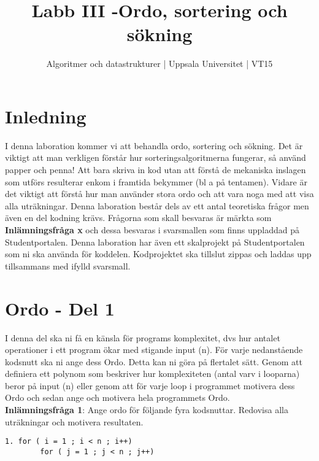 \documentclass{article}
\begin{document}
  \title{Labb III -Ordo, sortering och sökning }
  \author{ Algoritmer och datastrukturer | Uppsala Universitet | VT15 }
  \date{}
  \maketitle


  \section*{Inledning}
   I denna laboration kommer vi att behandla ordo, sortering och sökning. Det är viktigt att man verkligen förstår hur sorteringsalgoritmerna fungerar, så använd papper och penna! Att bara skriva in kod utan att förstå de mekaniska inslagen som utförs resulterar enkom i framtida bekymmer (bl a på tentamen). Vidare är det viktigt att förstå hur man använder stora ordo och att vara noga med att visa alla uträkningar. Denna laboration består dels av ett antal teoretiska frågor men även en del kodning krävs. Frågorna som skall besvaras är märkta som \textbf{Inlämningsfråga x} och dessa besvaras i svarsmallen som finns uppladdad på Studentportalen. Denna laboration har även ett skalprojekt på Studentportalen som ni ska använda för koddelen. Kodprojektet ska tillslut zippas och laddas upp tillsammans med ifylld svarsmall.
   



  \section*{Ordo - Del 1
  }

  I denna del ska ni få en känsla för programs komplexitet, dvs hur antalet operationer i ett
  program ökar med stigande input (n). För varje nedanstående kodsnutt ska ni ange dess
  Ordo. Detta kan ni göra på flertalet sätt. Genom att definiera ett polynom som beskriver
  hur komplexiteten (antal varv i looparna) beror på input (n) eller genom att för varje loop
  i programmet motivera dess Ordo och sedan ange och motivera hela programmets Ordo. \\
  
  \textbf{Inlämningsfråga 1}: Ange ordo för följande fyra kodsnuttar. Redovisa alla uträkningar och motivera resultaten.
  
  
  
  
   \begin{lstlisting}
1. for ( i = 1 ; i < n ; i++)
		for ( j = 1 ; j < n ; j++)
    \end{lstlisting}
    
\end{document}
